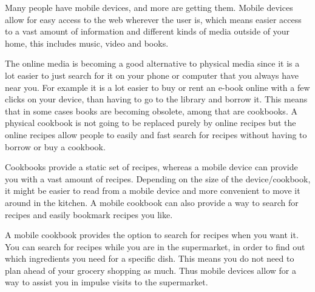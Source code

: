 Many people have mobile devices, and more are getting them\citep{mobilegrow}. Mobile devices allow for easy access to the web wherever the user is, which means easier access to a vast amount of information and different kinds of media outside of your home, this includes music, video and books.

The online media is becoming a good alternative to physical media since it is a lot easier to just search for it on your phone or computer that you always have near you. For example it is a lot easier to buy or rent an e-book online with a few clicks on your device, than having to go to the library and borrow it. This means that in some cases books are becoming obsolete, among that are cookbooks. A physical cookbook is not going to be replaced purely by online recipes but the online recipes allow people to easily and fast search for recipes without having to borrow or buy a cookbook.

Cookbooks provide a static set of recipes, whereas a mobile device can provide you with a vast amount of recipes. Depending on the size of the device/cookbook, it might be easier to read from a mobile device and more convenient to move it around in the kitchen. A mobile cookbook can also provide a way to search for recipes and easily bookmark recipes you like.

A mobile cookbook provides the option to search for recipes when you want it. You can search for recipes while you are in the supermarket, in order to find out which ingredients you need for a specific dish. This means you do not need to plan ahead of your grocery shopping as much. Thus mobile devices allow for a way to assist you in impulse visits to the supermarket.
